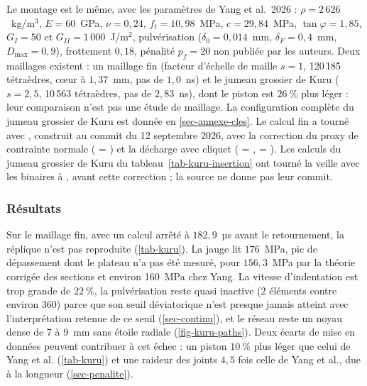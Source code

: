 Le montage est le même, avec les paramètres de Yang et al.~2026 : $\rho = 2\,626$~kg/m$^3$, $E = 60$~GPa, $\nu = 0{,}24$, $f_t = 10{,}98$~MPa, $c = 29{,}84$~MPa, $\tan\varphi = 1{,}85$, $G_I = 50$ et $G_{II} = 1\,000$~J/m$^2$, pulvérisation ($\delta_0 = 0{,}014$~mm, $\delta_F = 0{,}4$~mm, $D_\text{max} = 0{,}9$), frottement $0{,}18$, pénalité $p_f = 20$ non publiée par les auteurs. Deux maillages existent : un maillage fin (facteur d'échelle de maille $s = 1$, 120\,185 tétraèdres, cœur à $1{,}37$~mm, pas de $1{,}0$~ns) et le jumeau grossier de Kuru ($s = 2{,}5$, 10\,563 tétraèdres, pas de $2{,}83$~ns), dont le piston est $26~\%$ plus léger : leur comparaison n'est pas une étude de maillage. La configuration complète du jumeau grossier de Kuru est donnée en \cref{sec-annexe-cles}. Le calcul fin a tourné avec , construit au commit  du 12 septembre 2026, avec la correction du proxy de contrainte normale ( = ) et la décharge  avec cliquet ( = ,  = ). Les calculs du jumeau grossier de Kuru du tableau~\ref{tab-kuru-insertion} ont tourné la veille avec les binaires  à , avant cette correction ; la source ne donne pas leur commit.

\subsubsection{Résultats}

Sur le maillage fin, avec un calcul arrêté à $182{,}9$~µs avant le retournement, la réplique n'est pas reproduite (\cref{tab-kuru}). La jauge lit $176$~MPa, pic de dépassement dont le plateau n'a pas été mesuré, pour $156{,}3$~MPa par la théorie corrigée des sections et environ 160~MPa chez Yang. La vitesse d'indentation est trop grande de $22~\%$, la pulvérisation reste quasi inactive (2 éléments contre environ 360) parce que son seuil déviatorique n'est presque jamais atteint avec l'interprétation retenue de ce seuil (\cref{sec-continu}), et le réseau reste un noyau dense de 7 à 9~mm sans étoile radiale (\cref{fig-kuru-paths}). Deux écarts de mise en données peuvent contribuer à cet échec : un piston $10~\%$ plus léger que celui de Yang et al. (\cref{tab-kuru}) et une raideur des joints $4{,}5$ fois celle de Yang et al., due à la longueur  (\cref{sec-penalite}).

